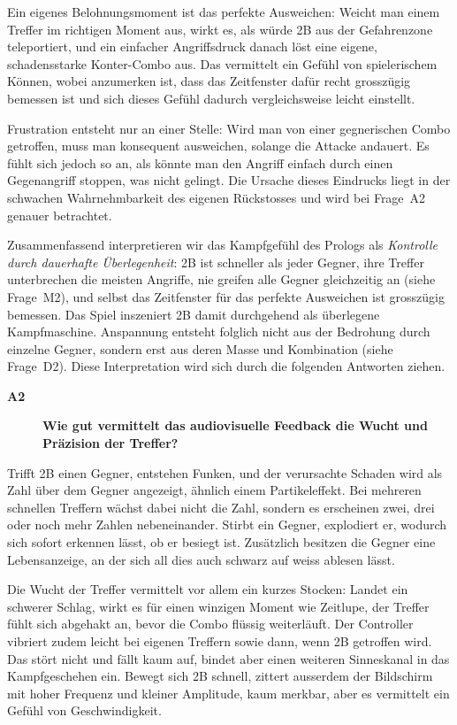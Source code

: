\documentclass[../Main.tex]{subfiles}
\begin{document}
Ein eigenes Belohnungsmoment ist das perfekte Ausweichen: Weicht man einem Treffer im richtigen Moment aus, wirkt es, als würde 2B aus der Gefahrenzone teleportiert, und ein einfacher Angriffsdruck danach löst eine eigene, schadensstarke Konter-Combo aus. Das vermittelt ein Gefühl von spielerischem Können, wobei anzumerken ist, dass das Zeitfenster dafür recht grosszügig bemessen ist und sich dieses Gefühl dadurch vergleichsweise leicht einstellt.

Frustration entsteht nur an einer Stelle: Wird man von einer gegnerischen Combo getroffen, muss man konsequent ausweichen, solange die Attacke andauert. Es fühlt sich jedoch so an, als könnte man den Angriff einfach durch einen Gegenangriff stoppen, was nicht gelingt. Die Ursache dieses Eindrucks liegt in der schwachen Wahrnehmbarkeit des eigenen Rückstosses und wird bei Frage~A2 genauer betrachtet.

Zusammenfassend interpretieren wir das Kampfgefühl des Prologs als \textit{Kontrolle durch dauerhafte Überlegenheit}: 2B ist schneller als jeder Gegner, ihre Treffer unterbrechen die meisten Angriffe, nie greifen alle Gegner gleichzeitig an (siehe Frage~M2), und selbst das Zeitfenster für das perfekte Ausweichen ist grosszügig bemessen. Das Spiel inszeniert 2B damit durchgehend als überlegene Kampfmaschine. Anspannung entsteht folglich nicht aus der Bedrohung durch einzelne Gegner, sondern erst aus deren Masse und Kombination (siehe Frage~D2). Diese Interpretation wird sich durch die folgenden Antworten ziehen.

\begin{description}
    \item[\textbf{A2}] \textbf{Wie gut vermittelt das audiovisuelle Feedback die Wucht und Präzision der Treffer?}
\end{description}

Trifft 2B einen Gegner, entstehen Funken, und der verursachte Schaden wird als Zahl über dem Gegner angezeigt, ähnlich einem Partikeleffekt. Bei mehreren schnellen Treffern wächst dabei nicht die Zahl, sondern es erscheinen zwei, drei oder noch mehr Zahlen nebeneinander. Stirbt ein Gegner, explodiert er, wodurch sich sofort erkennen lässt, ob er besiegt ist. Zusätzlich besitzen die Gegner eine Lebensanzeige, an der sich all dies auch schwarz auf weiss ablesen lässt.

Die Wucht der Treffer vermittelt vor allem ein kurzes Stocken: Landet ein schwerer Schlag, wirkt es für einen winzigen Moment wie Zeitlupe, der Treffer fühlt sich abgehakt an, bevor die Combo flüssig weiterläuft. Der Controller vibriert zudem leicht bei eigenen Treffern sowie dann, wenn 2B getroffen wird. Das stört nicht und fällt kaum auf, bindet aber einen weiteren Sinneskanal in das Kampfgeschehen ein. Bewegt sich 2B schnell, zittert ausserdem der Bildschirm mit hoher Frequenz und kleiner Amplitude, kaum merkbar, aber es vermittelt ein Gefühl von Geschwindigkeit.
\end{document}
